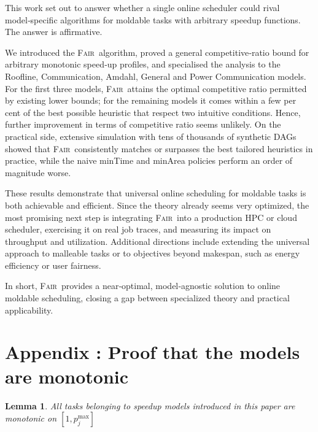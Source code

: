 \documentclass{article}
\newtheorem{lemma}{Lemma}
\newcommand\fair{\textsc{Fair}\xspace}
\begin{document}
This work set out to answer whether a single online scheduler could rival model‑specific algorithms for moldable tasks with arbitrary speedup functions.  
The answer is affirmative.  

We introduced the \fair\ algorithm, proved a general competitive‑ratio bound for arbitrary monotonic speed‑up profiles, and specialised the analysis to the Roofline, Communication, Amdahl, General and Power Communication models.  
For the first three models, \fair\ attains the optimal competitive ratio permitted by existing lower bounds; for the remaining models it comes within a few per cent of the best possible heuristic that respect two intuitive conditions. Hence, further improvement in terms of competitive ratio seems unlikely. 
On the practical side, extensive simulation with tens of thousands of synthetic DAGs showed that \fair\ consistently matches or surpasses the best tailored heuristics in practice, while the naive minTime and minArea policies perform an order of magnitude worse.  

These results demonstrate that universal online scheduling for moldable tasks is both achievable and efficient.  
Since the theory already seems very optimized, the most promising next step is integrating \fair\ into a production HPC or cloud scheduler, exercising it on real job traces, and measuring its impact on throughput and utilization.  
Additional directions include extending the universal approach to malleable tasks or to objectives beyond makespan, such as energy efficiency or user fairness.  

In short, \fair\ provides a near‑optimal, model‑agnostic solution to online moldable scheduling, closing a gap between specialized theory and practical applicability.





\appendix
\FloatBarrier 

\newpage

\section{Appendix : Proof that the models are monotonic}
\label{ap.detailedproof}

\begin{lemma}
All tasks belonging to speedup models introduced in this paper are monotonic on $[1, p_j^{\max}]$
\end{lemma}
\end{document}
